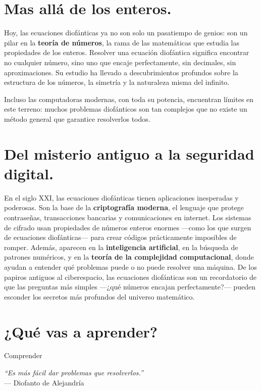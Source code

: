 \section*{Mas allá de los enteros.}
\begin{reseñaplana}
Hoy, las ecuaciones diofánticas ya no son solo un pasatiempo de genios: son un pilar en la \textbf{teoría de números}, 
la rama de las matemáticas que estudia las propiedades de los enteros.  
Resolver una ecuación diofántica significa encontrar no cualquier número, sino uno que encaje perfectamente, sin decimales, sin aproximaciones.  
Su estudio ha llevado a descubrimientos profundos sobre la estructura de los números, la simetría y la naturaleza misma del infinito.  

Incluso las computadoras modernas, con toda su potencia, encuentran límites en este terreno: muchos problemas diofánticos son tan complejos 
que no existe un método general que garantice resolverlos todos. 
\end{reseñaplana} 

\section*{Del misterio antiguo a la seguridad digital.}
\begin{reseñaplana}
En el siglo XXI, las ecuaciones diofánticas tienen aplicaciones inesperadas y poderosas.  
Son la base de la \textbf{criptografía moderna}, el lenguaje que protege contraseñas, transacciones bancarias y 
comunicaciones en internet.  
Los sistemas de cifrado usan propiedades de números enteros enormes —como los que surgen de ecuaciones diofánticas— para crear 
códigos prácticamente imposibles de romper.  
Además, aparecen en la \textbf{inteligencia artificial}, en la búsqueda de patrones numéricos, 
y en la \textbf{teoría de la complejidad computacional}, donde ayudan a entender qué problemas puede o no puede resolver una máquina.  
De los papiros antiguos al ciberespacio, las ecuaciones diofánticas son un recordatorio de que las preguntas más 
simples —¿qué números encajan perfectamente?— pueden esconder los secretos más profundos del universo matemático.
\end{reseñaplana}

\section*{¿Qué vas a aprender?}
\begin{aprende}
  \item Comprender 
\end{aprende}

\vspace{1cm}
\begin{flushright}
  {\oneptup\itshape ``Es más fácil dar problemas que resolverlos.''}\\
  {\oneptup — Diofanto de Alejandría}
\end{flushright}

